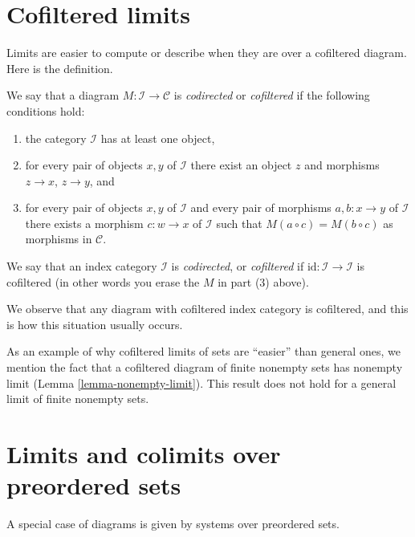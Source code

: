 \section{Cofiltered limits}
\label{section-codirected-limits}

\noindent
Limits are easier to compute or describe when they
are over a cofiltered diagram. Here is the definition.

\begin{definition}
\label{definition-codirected}
We say that a diagram $M : \mathcal{I} \to \mathcal{C}$ is {\it codirected}
or {\it cofiltered} if the following conditions hold:
\begin{enumerate}
\item the category $\mathcal{I}$ has at least one object,
\item for every pair of objects $x, y$ of $\mathcal{I}$
there exist an object $z$ and morphisms $z \to x$,
$z \to y$, and
\item for every pair of objects $x, y$ of $\mathcal{I}$
and every pair of morphisms $a, b : x \to y$ of $\mathcal{I}$
there exists a morphism $c : w \to x$ of $\mathcal{I}$
such that $M(a \circ c) = M(b \circ c)$ as morphisms in $\mathcal{C}$.
\end{enumerate}
We say that an index category $\mathcal{I}$ is {\it codirected}, or
{\it cofiltered} if $\text{id} : \mathcal{I} \to \mathcal{I}$ is
cofiltered (in other words you erase the $M$ in part (3) above).
\end{definition}

\noindent
We observe that any diagram with cofiltered index category is cofiltered,
and this is how this situation usually occurs.

\medskip\noindent
As an example of why cofiltered limits of sets are ``easier'' than
general ones, we mention the fact that a cofiltered diagram of finite
nonempty sets has nonempty limit (Lemma \ref{lemma-nonempty-limit}).
This result does not hold for a general limit of finite
nonempty sets.












\section{Limits and colimits over preordered sets}
\label{section-posets-limits}

\noindent
A special case of diagrams is given by systems over preordered sets.

